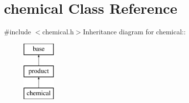 \hypertarget{classchemical}{
\section{chemical Class Reference}
\label{classchemical}
}


{\ttfamily \#include $<$chemical.h$>$}Inheritance diagram for chemical::\begin{figure}[H]
\begin{center}
\leavevmode
\includegraphics[height=3cm]{classchemical}
\end{center}
\end{figure}

